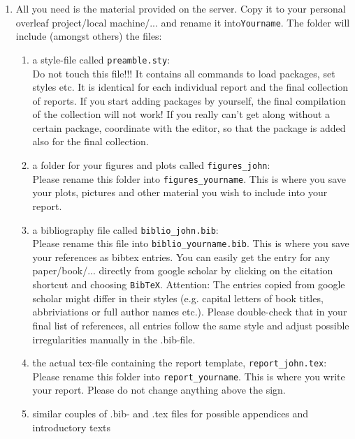 \documentclass[11pt,a4paper]{article}
\begin{document}
\begin{enumerate}
   \item All you need is the material provided on the server. Copy it to your personal overleaf project/local machine/... and rename it into\texttt{Yourname}. The folder will include (amongst others) the files: 
   \begin{enumerate}
        \item a style-file called \texttt{preamble.sty}: \\
            Do not touch this file!!! It contains all commands to load packages, set styles etc. It is identical for each individual report and the final collection of reports. If you start adding packages by yourself, the final compilation of the collection will not work! If you really can't get along without a certain package, coordinate with the editor, so that the package is added also for the final collection.
        \item a folder for your figures and plots called \texttt{figures\_john}: \\
            Please rename this folder into \texttt{figures\_yourname}. This is where you save your plots, pictures and other material you wish to include into your report.
        \item a bibliography file called \texttt{biblio\_john.bib}: \\
            Please rename this file into \texttt{biblio\_yourname.bib}. This is where you save your references as bibtex entries. You can easily get the entry for any paper/book/... directly from google scholar by clicking on the citation shortcut and choosing \texttt{BibTeX}. Attention: The entries copied from google scholar might differ in their styles (e.g. capital letters of book titles, abbriviations or full author names etc.). Please double-check that in your final list of references, all entries follow the same style and adjust possible irregularities manually in the .bib-file.
        \item the actual tex-file containing the report template, \texttt{report\_john.tex}: \\
            Please rename this folder into \texttt{report\_yourname}. This is where you write your report. Please do not change anything above the sign.
        \item similar couples of .bib- and .tex files for possible appendices and introductory texts
   \end{enumerate}
   

\end{enumerate}
\end{document}
